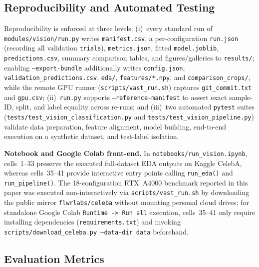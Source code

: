 \documentclass[12pt,a4paper]{article}
\newcommand{\code}[1]{\texttt{#1}}
\begin{document}
\subsection{Reproducibility and Automated Testing}
\label{subsec:reproducibility}

Reproducibility is enforced at three levels: (i)~every standard run of \code{modules/\allowbreak{}vision/\allowbreak{}run.py} writes \code{manifest.csv}, a per-configuration \code{run.json} (recording all validation \code{trials}), \code{metrics.json}, fitted \code{model.joblib}, \code{predictions.csv}, summary comparison tables, and figures/galleries to \code{results/\allowbreak{}}; enabling \code{--export-bundle} additionally writes \code{config.json}, \code{validation\_\allowbreak{}predictions.csv}, \code{eda/}, \code{features/\allowbreak{}*.npy}, and \code{comparison\_\allowbreak{}crops/}, while the remote GPU runner (\code{scripts/\allowbreak{}vast\_\allowbreak{}run.sh}) captures \code{git\_\allowbreak{}commit.txt} and \code{gpu.csv}; (ii)~\code{run.py} supports \code{--reference-manifest} to assert exact sample-ID, split, and label equality across re-runs; and (iii)~two automated \code{pytest} suites (\code{tests/\allowbreak{}test\_\allowbreak{}vision\_\allowbreak{}classification.py} and \code{tests/\allowbreak{}test\_\allowbreak{}vision\_\allowbreak{}pipeline.py}) validate data preparation, feature alignment, model building, end-to-end execution on a synthetic dataset, and test-label isolation.

\textbf{Notebook and Google Colab front-end.} In \code{notebooks/\allowbreak{}run\_\allowbreak{}vision.ipynb}, cells~1--33 preserve the executed full-dataset EDA outputs on Kaggle CelebA, whereas cells~35--41 provide interactive entry points calling \code{run\_\allowbreak{}eda()} and \code{run\_\allowbreak{}pipeline()}. The 18-configuration RTX~A4000 benchmark reported in this paper was executed non-interactively via \code{scripts/\allowbreak{}vast\_\allowbreak{}run.sh} by downloading the public mirror \code{flwrlabs/\allowbreak{}celeba} without mounting personal cloud drives; for standalone Google Colab \code{Runtime -> Run all} execution, cells~35--41 only require installing dependencies (\code{requirements.txt}) and invoking \code{scripts/\allowbreak{}download\_\allowbreak{}celeba.py --data-dir data} beforehand.

\subsection{Evaluation Metrics}
\label{subsec:metrics}
\end{document}
